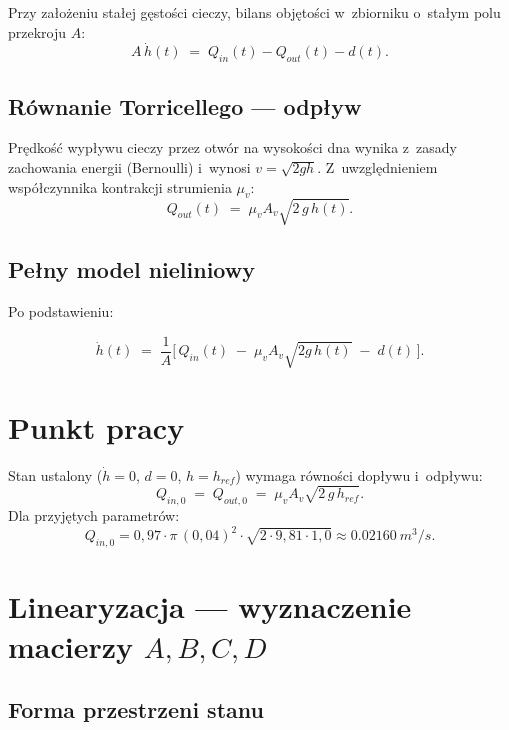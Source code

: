 \documentclass[11pt,a4paper]{article}
\begin{document}
Przy założeniu stałej gęstości cieczy, bilans objętości w~zbiorniku
o~stałym polu przekroju $A$:
\begin{equation}
A\,\dot h(t) \;=\; Q_{in}(t) - Q_{out}(t) - d(t).
\end{equation}

\subsection{Równanie Torricellego --- odpływ}

Prędkość wypływu cieczy przez otwór na wysokości dna wynika z~zasady
zachowania energii (Bernoulli) i~wynosi $v = \sqrt{2gh}$. Z~uwzględnieniem
współczynnika kontrakcji strumienia $\mu_v$:
\begin{equation}
Q_{out}(t) \;=\; \mu_v A_v \sqrt{2\,g\,h(t)}.
\end{equation}

\subsection{Pełny model nieliniowy}

Po podstawieniu:
\begin{wzor}
\begin{equation}
\dot h(t) \;=\; \frac{1}{A}\Big[\,Q_{in}(t) \;-\; \mu_v A_v \sqrt{2 g\,h(t)} \;-\; d(t)\,\Big].
\label{eq:nonlin}
\end{equation}
\end{wzor}

\section{Punkt pracy}

Stan ustalony ($\dot h=0$, $d=0$, $h=h_{ref}$) wymaga równości dopływu
i~odpływu:
\begin{equation}
Q_{in,0} \;=\; Q_{out,0} \;=\; \mu_v A_v \sqrt{2\,g\,h_{ref}}.
\end{equation}
Dla przyjętych parametrów:
\[
Q_{in,0} = 0{,}97 \cdot \pi\,(0{,}04)^2 \cdot \sqrt{2 \cdot 9{,}81 \cdot 1{,}0}
\approx \SI{0.02160}{m^3/s}.
\]

\section{Linearyzacja --- wyznaczenie macierzy \texorpdfstring{$A,B,C,D$}{A,B,C,D}}

\subsection{Forma przestrzeni stanu}
\end{document}
